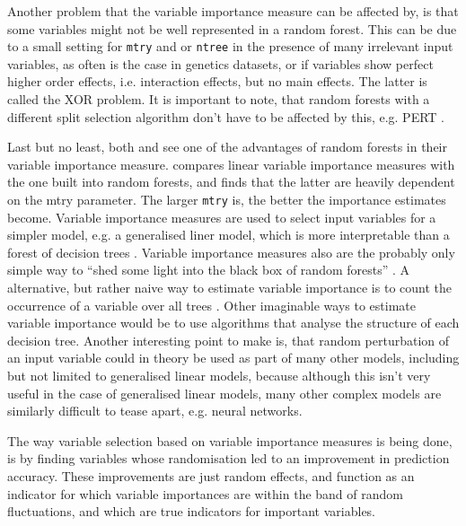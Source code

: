 \documentclass[a4paper,man,12pt,apacite,floatsintext,draftfirst]{apa6} %
\begin{document}
Another problem that the variable importance measure can be affected by,
is that some variables might not be well represented in a random forest.
This can be due to a small setting for \texttt{mtry} and or \texttt{ntree}
in the presence of many irrelevant input variables, as often is the case
in genetics datasets, or if variables show perfect higher order effects,
i.e. interaction effects, but no main effects.
The latter is called the XOR problem.
It is important to note, that random forests with a different split selection
algorithm don't have to be affected by this, e.g. PERT \cite{cutler2001pert}.

Last but no least, both \cite{strobl2009introduction} and
\cite{gromping2009variable} see one of the advantages of random forests in
their variable importance measure.
\cite{gromping2009variable} compares linear variable importance measures
with the one built into random forests, and finds that the latter are
heavily dependent on the mtry parameter.
The larger \texttt{mtry} is, the better the importance estimates become.
Variable importance measures are used to select input variables for a simpler
model, e.g. a generalised liner model, which is more interpretable than a
forest of decision trees \cite{strobl2009introduction}.
Variable importance measures also are the probably only simple way to
“shed some light into the black box of random forests”
\cite{gromping2009variable}.
A alternative, but rather naive way to estimate variable importance is to count
the occurrence of a variable over all trees \cite{strobl2009introduction}.
Other imaginable ways to estimate variable importance would be to use
algorithms that analyse the structure of each decision tree.
Another interesting point to make is, that random perturbation of an input
variable could in theory be used as part of many other models, including but
not limited to generalised linear models, because although
this isn't very useful in the case of generalised linear models,
many other complex models are similarly difficult to tease apart, e.g.
neural networks.

The way variable selection based on variable importance measures is
being done, is by finding variables whose randomisation led to an improvement
in prediction accuracy.
These improvements are just random effects, and function as an indicator
for which variable importances are within the band of random fluctuations,
and which are true indicators for important variables.
\end{document}

